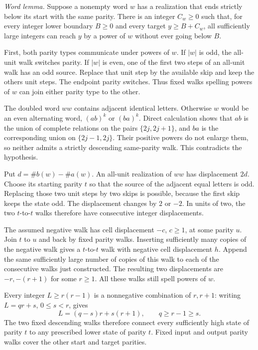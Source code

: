 \emph{Word lemma.}
Suppose a nonempty word \(w\) has a realization that
ends strictly below its start with the same parity.
There is an integer \(C_w\geq0\) such that, for
every integer lower boundary \(B\geq0\) and every target
\(y\geq B+C_w\), all sufficiently large integers
can reach \(y\) by a power of \(w\) without ever
going below \(B\).

First, both parity types communicate under powers
of \(w\). If \(|w|\) is odd, the all-unit walk
switches parity. If \(|w|\) is even, one of the
first two steps of an all-unit walk has an odd
source. Replace that unit step by the available
skip and keep the others unit steps. The endpoint
parity switches. Thus fixed walks spelling powers
of \(w\) can join either parity type to the other.

The doubled word \(ww\) contains adjacent identical
letters. Otherwise \(w\) would be an even alternating
word, \((ab)^k\) or \((ba)^k\). Direct calculation
shows that \(ab\) is the union of complete relations
on the pairs \(\{2j,2j+1\}\), and \(ba\) is the
corresponding union on \(\{2j-1,2j\}\).
Their positive powers do not enlarge them, so neither
admits a strictly descending same-parity walk.
This contradicts the hypothesis.

Put \(d=\#b(w)-\#a(w)\). An all-unit realization
of \(ww\) has displacement \(2d\). Choose its
starting parity \(t\) so that the source of the
adjacent equal letters is odd. Replacing those two
unit steps by two skips is possible, because the
first skip keeps the state odd. The displacement
changes by \(2\) or \(-2\).
In units of two, the two \(t\)-to-\(t\) walks
therefore have consecutive integer displacements.

The assumed negative walk has cell displacement
\(-c\), \(c\geq1\), at some parity \(u\).
Join \(t\) to \(u\) and back by fixed parity
walks. Inserting sufficiently many copies of the
negative walk gives a \(t\)-to-\(t\) walk with
negative cell displacement \(h\).
Append the same sufficiently large number of
copies of this walk to each of the consecutive
walks just constructed. The resulting two
displacements are \(-r,-(r+1)\) for some \(r\geq1\).
All these walks still spell powers of \(w\).

Every integer \(L\geq r(r-1)\) is a nonnegative
combination of \(r,r+1\): writing \(L=qr+s\),
\(0\leq s<r\), gives
\[
 L=(q-s)r+s(r+1),\qquad q\geq r-1\geq s.
\]
The two fixed descending walks therefore connect
every sufficiently high state of parity \(t\)
to any prescribed lower state of parity \(t\).
Fixed input and output parity walks cover the
other start and target parities.

